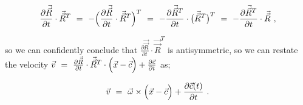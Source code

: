 \documentclass{article}
\begin{document}
\begin{equation} \label{eb-eq-1-57}
\frac{\partial{\vec{\vec{R}}}}{\partial{t}} \cdot  \vec{\vec{R}}^{T} \hspace{0.125cm} = \hspace{0.125cm} - \Big( \frac{\partial{\vec{\vec{R}}}}{\partial{t}} \cdot  \vec{\vec{R}}^{T} \Big)^{T}  \hspace{0.125cm} = \hspace{0.125cm} - \frac{\partial{\vec{\vec{R}}^{T}}}{\partial{t}} \cdot \big( \vec{\vec{R}}^{T} \big)^{T}  \hspace{0.125cm} = \hspace{0.125cm} - \frac{\partial{\vec{\vec{R}}^{T}}}{\partial{t}} \cdot \vec{\vec{R}} \hspace{0.125cm} ,
\end{equation}

so we can confidently conclude that \begin{math} \frac{\partial{\vec{\vec{R}}}}{\partial{t}} \cdot  \vec{\vec{R}}^{T} \end{math} is antisymmetric, so we can restate the velocity \begin{math} \vec{v} \hspace{0.125cm} = \hspace{0.125cm} \frac{\partial{\vec{\vec{R}}}}{\partial{t}} \cdot  \vec{\vec{R}}^{T} \cdot \Big( \vec{x} - \vec{c} \Big) + \frac{\partial{\vec{c}}}{\partial{t}} \end{math} as;

\begin{equation} \label{eb-eq-1-58}
\vec{v}  \hspace{0.125cm} =  \hspace{0.125cm} \vec{\omega} \times \Big( \vec{x} - \vec{c} \Big) + \frac{\partial{\vec{c}(t)}}{\partial{t}} \hspace{0.125cm} . 
\end{equation}
\end{document}
